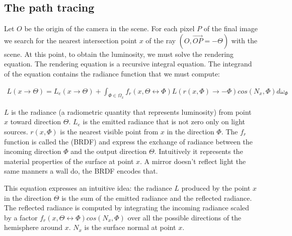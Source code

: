 %
%

\subsection{The path tracing}

Let $O$ be the origin of the camera in the scene. For each pixel $P$ of the final image we search for the nearest intersection point $x$ of the ray $(O, \overrightarrow{OP} = -\Theta)$ with the scene. At this point, to obtain the luminosity, we must solve the rendering equation. The rendering equation is a recursive integral equation. The integrand of the equation contains the radiance function that we must compute:

\begin{align*}
L(x \rightarrow \Theta) = L_e(x \rightarrow \Theta) + \int_{\Phi \in \Omega_x} f_r(x, \Theta \leftrightarrow \Phi) L(r(x, \Phi) \rightarrow -\Phi) cos(N_x, \Phi) d\omega_\Phi
\end{align*}

$L$ is the radiance (a radiometric quantity that represents luminosity) from point $x$ toward direction $\Theta$. $L_e$ is the emitted radiance that is not zero only on light sources. $r(x, \Phi)$ is the nearest visible point from $x$ in the direction $\Phi$. The $f_r$ function is called the  (BRDF) and express the exchange of radiance between the incoming direction $\Phi$ and the output direction $\Theta$. Intuitively it represents the material properties of the surface at point $x$. A mirror doesn't reflect light the same manners a wall do, the BRDF encodes that.

This equation expresses an intuitive idea: the radiance $L$ produced by the point $x$ in the direction $\Theta$ is the sum of the emitted radiance and the reflected radiance.  The reflected radiance is computed by integrating the incoming radiance scaled by a factor $f_r(x, \Theta \leftrightarrow \Phi) cos(N_x, \Phi)$ over all the possible directions of the hemisphere around $x$. $N_x$ is the surface normal at point $x$.

